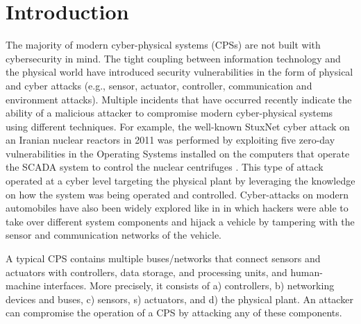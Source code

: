 \documentclass[letterpaper, 10 pt, conference]{ieeeconf}  %
\newcommand\NB[1]{$\spadesuit$\footnote{NB: #1}}
\begin{document}
\section{Introduction}
The majority of modern cyber-physical systems (CPSs) are not built with cybersecurity in mind. The tight coupling between information technology and the physical world have introduced security vulnerabilities in the form of physical and cyber attacks (e.g., sensor, actuator, controller, communication and environment attacks).
Multiple incidents that have occurred recently indicate the ability of a malicious attacker to compromise modern cyber-physical systems using different techniques. For example, the well-known StuxNet cyber attack on an Iranian nuclear reactors in 2011 was performed by exploiting five zero-day vulnerabilities in the Operating Systems installed on the computers that operate the SCADA system to control the nuclear centrifuges \cite{langner_2013}. This type of attack operated at a cyber level targeting the physical plant by leveraging the knowledge on how the system was being operated and controlled. Cyber-attacks on modern automobiles have also been widely explored like in \cite{miller} in which hackers were able to take over different system components and hijack a vehicle by tampering with the sensor and communication networks of the vehicle.

A typical CPS contains multiple buses/networks that connect sensors and actuators with controllers, data storage, and processing units, and human-machine interfaces. More precisely, it consists of a) controllers, b) networking devices and buses, c) sensors, s) actuators, and d) the physical plant. An attacker can compromise the operation of a CPS by attacking any of these components. 
\end{document}
